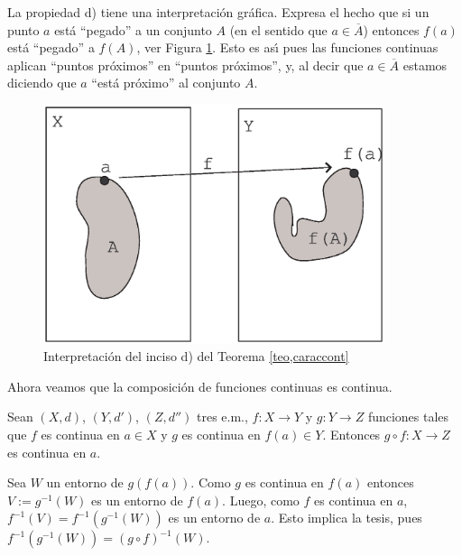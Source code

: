 La propiedad d) tiene una interpretaci\'on gr\'afica. Expresa el
hecho que si un punto $a$ est\'a ``pegado'' a un conjunto $A$ (en
el sentido que $a\in \overline{A}$) entonces $f(a)$ est\'a
``pegado'' a $f(A)$, ver Figura \ref{fig,interpretacionteo}. Esto
es as\'{\i} pues las funciones continuas aplican ``puntos
pr\'oximos'' en ``puntos pr\'oximos'', y, al decir que
$a\in\overline{A}$ estamos diciendo que $a$ ``est\'a pr\'oximo''
al conjunto $A$.

\begin{figure}[h]
\begin{center}
    \includegraphics[height=7cm, width=10cm]{fclausu.eps}
    \caption{Interpretaci\'on del inciso d) del Teorema
    \ref{teo,caraccont}}\label{fig,interpretacionteo}
\end{center}
\end{figure}

Ahora veamos que la composici\'on de funciones continuas es
continua.

\begin{proposicion} Sean $(X,d)$, $(Y,d')$, $(Z,d'')$ tres e.m.,
$f:X\rightarrow Y$ y $g:Y\rightarrow Z$ funciones tales que $f$ es
continua en $a\in X$ y $g$ es continua en $f(a)\in Y$. Entonces
$g\circ f:X\rightarrow Z$ es continua en $a$.
\end{proposicion}
\begin{demo} Sea $W$ un entorno de $g(f(a))$. Como $g$ es continua
en $f(a)$ entonces $V:=g^{-1}(W)$ es un entorno de $f(a)$. Luego,
como $f$ es continua en $a$, $f^{-1}(V)=f^{-1}(g^{-1}(W))$ es un
entorno de $a$. Esto implica la tesis, pues
$f^{-1}(g^{-1}(W))=(g\circ f)^{-1}(W)$.
\end{demo}

